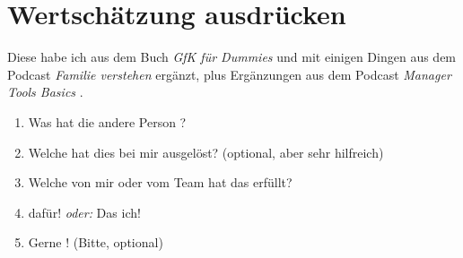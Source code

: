 \section{Wertschätzung ausdrücken}
\label{wertschaetzung}

Diese habe ich aus dem Buch \emph{GfK für Dummies} \cite[S.~206]{gfk-dummies} und mit einigen Dingen aus dem Podcast \emph{Familie verstehen} \cite{familie-verstehen-podcast} ergänzt, plus Ergänzungen aus dem Podcast \emph{Manager Tools Basics} \cite{manager-tools-basics}.

\begin{enumerate}
    \item Was hat die andere Person ?
    \item Welche  hat dies bei mir ausgelöst? (optional, aber sehr hilfreich)
    \item Welche  von mir oder vom Team hat das erfüllt?
    \item {} dafür! \emph{oder:} Das  ich!
    \item Gerne ! (Bitte, optional)
\end{enumerate}
